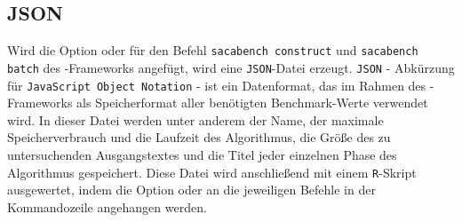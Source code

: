 \subsection{JSON}

Wird die Option  oder  für den Befehl \texttt{sacabench construct} und \texttt{sacabench batch} des \sacabench-Frameworks angefügt, wird eine \texttt{JSON}-Datei erzeugt. \texttt{JSON} - Abkürzung für \texttt{JavaScript Object Notation} - ist ein Datenformat, das im Rahmen des \sacabench-Frameworks als Speicherformat aller benötigten Bench\-mark-Werte verwendet wird. In dieser Datei werden unter anderem der Name, der maximale Speicherverbrauch und die Laufzeit des Algorithmus, die Größe des zu untersuchenden Ausgangstextes und die Titel jeder einzelnen Phase des Algorithmus gespeichert. Diese Datei wird anschließend mit einem \texttt{R}-Skript ausgewertet, indem die Option  oder  an die jeweiligen Befehle in der Kommandozeile angehangen werden.

